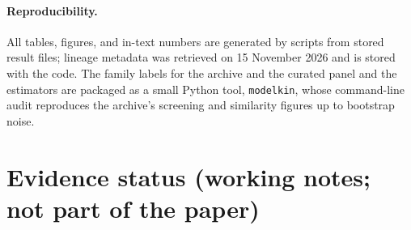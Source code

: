 \documentclass[10pt]{article}
\newif\ifdraft
\theoremstyle{remark}\newtheorem{remark}{Remark}
\begin{document}
\paragraph{Reproducibility.}
All tables, figures, and in-text numbers are generated by scripts from stored
result files; lineage metadata was retrieved on 15 November 2026 and is stored
with the code. The family labels for the archive and the curated panel and the
estimators are packaged as a small Python tool, \texttt{modelkin}, whose
command-line audit reproduces the archive's screening and similarity figures
up to bootstrap noise.




\ifdraft
\appendix
\section{Evidence status (working notes; not part of the paper)}
\end{document}
